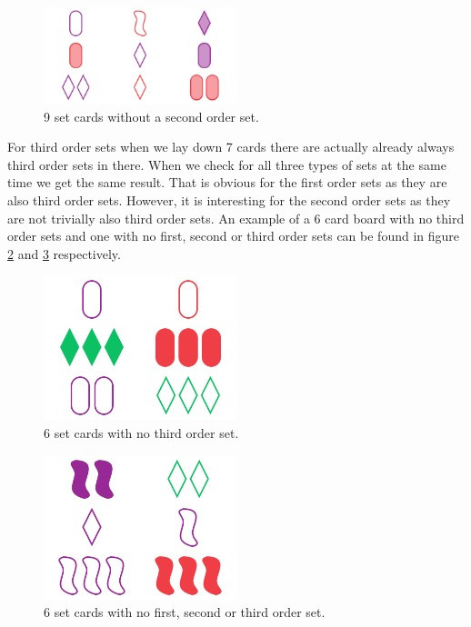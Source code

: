 \documentclass[12pt]{scrartcl}
\begin{document}
\begin{figure}[h]
    \centering
    \includegraphics[width=0.5\textwidth]{../set/board_9_1_nd}
    \caption{9 set cards without a second order set.}
    \label{fig:2-9}
\end{figure}

For third order sets when we lay down 7 cards there are actually already always third order sets in there. When we check for all three types of sets at the same time we get the same result. That is obvious for the first order sets as they are also third order sets. However, it is interesting for the second order sets as they are not trivially also third order sets. An example of a 6 card board with no third order sets and one with no first, second or third order sets can be found in figure \ref*{fig:3-6} and \ref*{fig:123-6} respectively.
 
\begin{figure}[h]
    \centering
    \includegraphics[width=0.5\textwidth]{../set/board_6_3_d}
    \caption{6 set cards with no third order set.}
    \label{fig:3-6}
\end{figure}

\begin{figure}[h]
    \centering
    \includegraphics[width=0.5\textwidth]{../set/board_6_123_d}
    \caption{6 set cards with no first, second or third order set.}
    \label{fig:123-6}
\end{figure}
\end{document}
